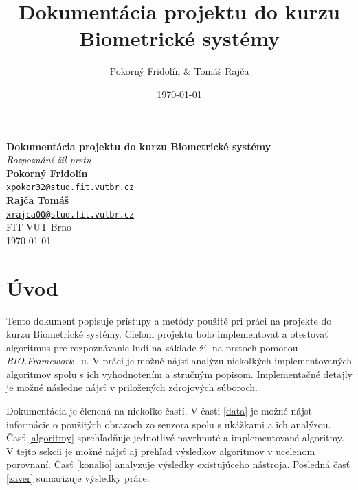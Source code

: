 \documentclass[11pt,a4paper]{article}
\begin{document}
\title{Dokumentácia projektu do kurzu Biometrické systémy}
\author{Pokorný Fridolín \& Tomáš Rajča}
\date{\today}

\vspace*{\fill}
\begin{center}
\textbf{\Huge\textbf{Dokumentácia projektu do kurzu Biometrické systémy}} \\
\vspace{8mm}
\textit{\Large\color{gray} Rozpoznání žil prstu}\\
\vspace*{\fill}
\vspace*{\fill}
\hfill\textbf{Pokorný Fridolín} \\
\hfill{\href{mailto:xpokor32@stud.fit.vutbr.cz}{\nolinkurl{xpokor32@stud.fit.vutbr.cz}}} \\
\hfill\textbf{Rajča Tomáš} \\
\hfill{\href{mailto:xrajca00@stud.fit.vutbr.cz}{\nolinkurl{xrajca00@stud.fit.vutbr.cz}}} \\
\hfill{FIT VUT Brno} \\
\hfill\today
\end{center}
\vspace*{\fill}

\renewcommand{\baselinestretch}{1.5}
\thispagestyle{empty}
\clearpage

\setcounter{page}{1}
\clearpage

\section{Úvod} \label{uvod}

Tento dokument popisuje prístupy a metódy použité pri práci na projekte do kurzu
Biometrické systémy. Cieľom projektu bolo implementovať a otestovať algoritmus
pre rozpoznávanie ľudí na základe žíl na prstoch pomocou
\emph{BIO.Framework}\,--\,u. V práci je možné nájsť analýzu niekoľkých
implementovaných algoritmov spolu s ich vyhodnotením a stručným popisom.
Implementačné detajly je možné následne nájsť v priložených zdrojových súboroch.

Dokumentácia je členená na niekoľko častí. V časti \ref{data} je možné nájsť
informácie o použitých obrazoch zo senzora spolu s ukážkami a ich analýzou. Časť
\ref{algoritmy} sprehľadňuje jednotlivé navrhnuté a implementované algoritmy.
V tejto sekcii je možné nájsť aj prehľad výsledkov algoritmov v ucelenom
porovnaní. Časť \ref{konalio} analyzuje výsledky existujúceho nástroja. Posledná
časť \ref{zaver} sumarizuje výsledky práce.
\end{document}
